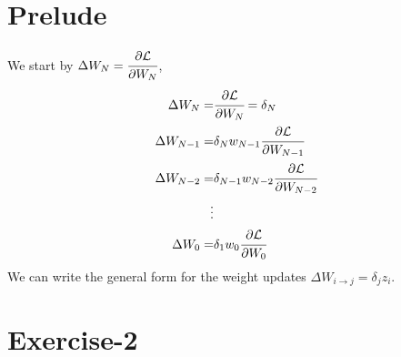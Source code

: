 \documentclass[10pt]{article}
\begin{document}
\section*{Prelude}

We start by $\Delta W_N = \cfrac{\partial \mathcal{L}}{\partial W_N}$,
\begin{align*}
\Delta W_N =& \cfrac{\partial \mathcal{L}}{\partial W_N} = \delta_N\\
\Delta W_{N-1}=& \delta_N w_{N-1} \cfrac{\partial \mathcal{L}}{\partial W_{N-1}}\\
\Delta W_{N-2}=& \delta_{N-1} w_{N-2} \cfrac{\partial \mathcal{L}}{\partial W_{N-2}}\\
\vdots\\
\Delta W_{0}=& \delta_{1} w_{0} \cfrac{\partial \mathcal{L}}{\partial W_{0}}\\
\end{align*}
We can write the general form for the weight updates $\Delta W_{i \rightarrow j} = \delta_j z_i$.

\section*{Exercise-2}
\end{document}
